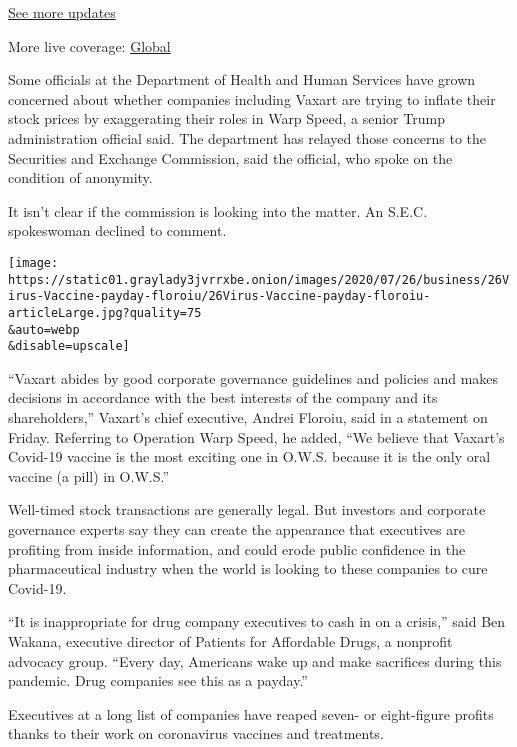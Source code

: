 \href{https://www.nytimes3xbfgragh.onion/live/2020/07/31/business/stock-market-today-coronavirus?action=click\&pgtype=Article\&state=default\&region=MAIN_CONTENT_1\&context=storylines_live_updates}{See
more updates}

More live coverage:
\href{https://www.nytimes3xbfgragh.onion/2020/08/01/world/coronavirus-covid-19.html?action=click\&pgtype=Article\&state=default\&region=MAIN_CONTENT_1\&context=storylines_live_updates}{Global}

Some officials at the Department of Health and Human Services have grown
concerned about whether companies including Vaxart are trying to inflate
their stock prices by exaggerating their roles in Warp Speed, a senior
Trump administration official said. The department has relayed those
concerns to the Securities and Exchange Commission, said the official,
who spoke on the condition of anonymity.

It isn't clear if the commission is looking into the matter. An S.E.C.
spokeswoman declined to comment.

\texttt{[image: https://static01.graylady3jvrrxbe.onion/images/2020/07/26/business/26Virus-Vaccine-payday-floroiu/26Virus-Vaccine-payday-floroiu-articleLarge.jpg?quality=75\\\&auto=webp\\\&disable=upscale]}

``Vaxart abides by good corporate governance guidelines and policies and
makes decisions in accordance with the best interests of the company and
its shareholders,'' Vaxart's chief executive, Andrei Floroiu, said in a
statement on Friday. Referring to Operation Warp Speed, he added, ``We
believe that Vaxart's Covid-19 vaccine is the most exciting one in
O.W.S. because it is the only oral vaccine (a pill) in O.W.S.''

Well-timed stock transactions are generally legal. But investors and
corporate governance experts say they can create the appearance that
executives are profiting from inside information, and could erode public
confidence in the pharmaceutical industry when the world is looking to
these companies to cure Covid-19.

``It is inappropriate for drug company executives to cash in on a
crisis,'' said Ben Wakana, executive director of Patients for Affordable
Drugs, a nonprofit advocacy group. ``Every day, Americans wake up and
make sacrifices during this pandemic. Drug companies see this as a
payday.''

Executives at a long list of companies have reaped seven- or
eight-figure profits thanks to their work on coronavirus vaccines and
treatments.

